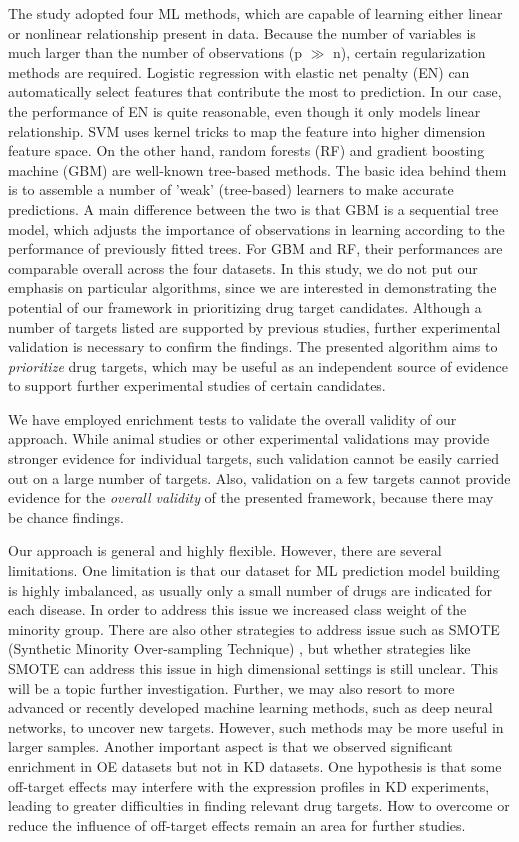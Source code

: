   The study adopted four ML methods, which are capable of learning either linear or nonlinear relationship present in data. Because the number of variables is much larger than the number of observations (p $\gg$ n), certain regularization methods are required. Logistic regression with elastic net penalty (EN) can automatically select features that contribute the most to prediction. In our case, the performance of EN is quite reasonable, even though it only models linear relationship. SVM uses kernel tricks to map the feature into higher dimension feature space. On the other hand, random forests (RF) and gradient boosting machine (GBM) are well-known tree-based methods. The basic idea behind them is to assemble a number of 'weak' (tree-based) learners to make accurate predictions. A main difference between the two is that GBM is a sequential tree model, which adjusts the importance of observations in learning according to the performance of previously fitted trees. For  GBM and RF, their performances are comparable overall across the four datasets. In this study, we do not put our emphasis on particular algorithms, since we are interested in demonstrating the potential of our framework in prioritizing drug target candidates. Although a number of targets listed are supported by previous studies, further experimental validation is necessary to confirm the findings. The presented algorithm aims to \textit{prioritize} drug targets, which may be useful as an independent source of evidence to  support further experimental studies of certain candidates. 

  We have employed enrichment tests to validate the overall validity of our approach. While animal studies or other experimental validations may provide stronger evidence for individual targets, such validation cannot be easily carried out on a large number of targets. Also, validation on a few targets cannot provide evidence for the \textit{overall validity }of the presented framework, because there may be chance findings. 

  Our approach is general and highly flexible. However, there are several limitations. One limitation is that our dataset for ML prediction model building is highly imbalanced, as usually only a small number of drugs are indicated for each disease. In order to address this issue we increased class weight of the minority group. There are also other strategies to address issue such as SMOTE (Synthetic Minority Over-sampling Technique) \cite{chawla2002smote}, but whether strategies like SMOTE can address this issue in high dimensional settings is still unclear. This will be a topic further investigation. Further, we may also resort to more advanced or recently developed machine learning methods, such as deep neural networks, to uncover new targets. However, such methods may be more useful in larger samples. Another important aspect is that we observed significant enrichment in OE datasets but not in KD datasets. One hypothesis is that some off-target effects may interfere with the expression profiles in KD experiments, leading to greater difficulties in finding relevant drug targets. How to overcome or reduce the influence of off-target effects remain an area for further studies. 

